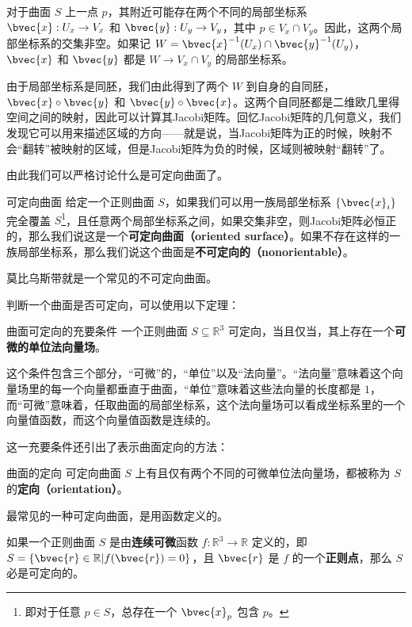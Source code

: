 

对于曲面 $S$ 上一点 $p$，其附近可能存在两个不同的局部坐标系 $\bvec{x}:U_x\to V_x$ 和 $\bvec{y}:U_y\to V_y$，其中 $p\in V_x\cap V_y$。因此，这两个局部坐标系的交集非空。如果记 $W=\bvec{x}^{-1}(U_x)\cap\bvec{y}^{-1}(U_y)$，$\bvec{x}$ 和 $\bvec{y}$ 都是 $W\to V_x\cap V_y$ 的局部坐标系。

由于局部坐标系是同胚，我们由此得到了两个 $W$ 到自身的自同胚，$\bvec{x}\circ\bvec{y}$ 和 $\bvec{y}\circ\bvec{x}$。这两个自同胚都是二维欧几里得空间之间的映射，因此可以计算其Jacobi矩阵。回忆Jacobi矩阵的几何意义，我们发现它可以用来描述区域的方向——就是说，当Jacobi矩阵为正的时候，映射不会“翻转”被映射的区域，但是Jacobi矩阵为负的时候，区域则被映射“翻转”了。

由此我们可以严格讨论什么是可定向曲面了。

\begin{definition}{可定向曲面}
给定一个正则曲面 $S$，如果我们可以用一族局部坐标系 $\{\bvec{x}_i\}$ 完全覆盖 $S$\footnote{即对于任意 $p\in S$，总存在一个 $\bvec{x}_p$ 包含 $p$。}，且任意两个局部坐标系之间，如果交集非空，则Jacobi矩阵必恒正的，那么我们说这是一个\textbf{可定向曲面（oriented surface）}。如果不存在这样的一族局部坐标系，那么我们说这个曲面是\textbf{不可定向的（nonorientable）}。
\end{definition}

莫比乌斯带就是一个常见的不可定向曲面。

判断一个曲面是否可定向，可以使用以下定理：

\begin{theorem}{曲面可定向的充要条件}
一个正则曲面 $S\subseteq \mathbb{R}^3$ 可定向，当且仅当，其上存在一个\textbf{可微的单位法向量场}。
\end{theorem}

这个条件包含三个部分，“可微”的，“单位”以及“法向量”。“法向量”意味着这个向量场里的每一个向量都垂直于曲面，“单位”意味着这些法向量的长度都是 $1$，而“可微”意味着，任取曲面的局部坐标系，这个法向量场可以看成坐标系里的一个向量值函数，而这个向量值函数是连续的。

这一充要条件还引出了表示曲面定向的方法：

\begin{definition}{曲面的定向}
可定向曲面 $S$ 上有且仅有两个不同的可微单位法向量场，都被称为 $S$ 的\textbf{定向（orientation）}。
\end{definition}

最常见的一种可定向曲面，是用函数定义的。

\begin{theorem}{}
如果一个正则曲面 $S$ 是由\textbf{连续可微}函数 $f:\mathbb{R}^3\to \mathbb{R}$ 定义的，即 $S=\{\bvec{r}\in\mathbb{R}|f(\bvec{r})=0\}$，且 $\bvec{r}$ 是 $f$ 的一个\textbf{正则点}，那么 $S$ 必是可定向的。
\end{theorem}






